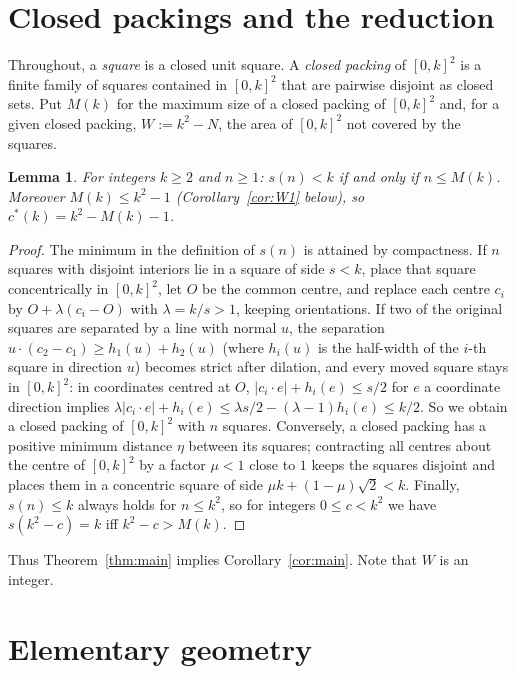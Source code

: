 \documentclass[11pt]{amsart}
\newtheorem{lemma}[theorem]{Lemma}
\theoremstyle{definition}
\theoremstyle{remark}
\begin{document}
\section{Closed packings and the reduction}

Throughout, a \emph{square} is a closed unit square. A \emph{closed packing} of $[0,k]^2$ is a finite family of squares
contained in $[0,k]^2$ that are pairwise disjoint as closed sets. Put $M(k)$ for the maximum size of a closed packing
of $[0,k]^2$ and, for a given closed packing, $W:=k^2-N$, the area of $[0,k]^2$ not covered by the squares.

\begin{lemma}\label{lem:red}
For integers $k\ge 2$ and $n\ge 1$: $s(n)<k$ if and only if $n\le M(k)$. Moreover $M(k)\le k^2-1$
\textup{(}Corollary~\ref{cor:W1} below\textup{)}, so $c^*(k)=k^2-M(k)-1$.
\end{lemma}

\begin{proof}
The minimum in the definition of $s(n)$ is attained by compactness. If $n$ squares with disjoint interiors lie in a
square of side $s<k$, place that square concentrically in $[0,k]^2$, let $O$ be the common centre, and replace each centre $c_i$ by
$O+\lambda(c_i-O)$ with $\lambda=k/s>1$, keeping orientations. If two of the original squares are separated by a line with normal $u$,
the separation $u\cdot(c_2-c_1)\ge h_1(u)+h_2(u)$ (where $h_i(u)$ is the half-width of the $i$-th square in direction $u$) becomes strict after
dilation, and every moved square stays in $[0,k]^2$: in coordinates centred at $O$, $|c_i\cdot e|+h_i(e)\le s/2$ for $e$ a
coordinate direction implies $\lambda|c_i\cdot e|+h_i(e)\le \lambda s/2-(\lambda-1)h_i(e)\le k/2$. So we obtain a closed packing of $[0,k]^2$ with $n$ squares.
Conversely, a closed packing has a positive minimum distance $\eta$ between its squares; contracting all centres
about the centre of $[0,k]^2$ by a factor $\mu<1$ close to $1$ keeps the squares disjoint and places them in a
concentric square of side $\mu k+(1-\mu)\sqrt 2<k$. Finally, $s(n)\le k$ always holds for $n\le k^2$, so
for integers $0\le c<k^2$ we have $s(k^2-c)=k$ iff $k^2-c>M(k)$.
\end{proof}

Thus Theorem~\ref{thm:main} implies Corollary~\ref{cor:main}. Note that $W$ is an integer.

\section{Elementary geometry}
\end{document}
